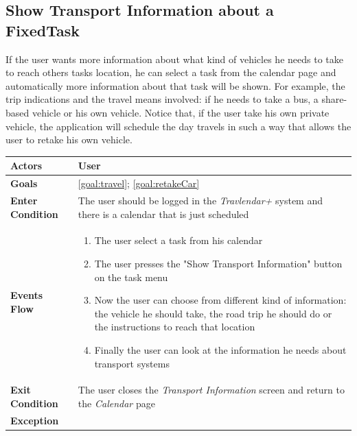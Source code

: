 \subsection{Show Transport Information about a FixedTask}

If the user wants more information about what kind of vehicles he needs to take to reach others tasks location, he can select a task from the calendar page and automatically more information about that task will be shown. For example, the trip indications and the travel means involved: if he needs to take a bus, a share-based vehicle or his own vehicle. Notice that, if the user take his own private vehicle, the application will schedule the day travels in such a way that allows the user to retake his own vehicle. 

\begin{table}[H]
	\centering
    
    \begin{tabular}{|p{3.5cm}|p{10.3cm}|}
    
    \hline
    \textbf{\large{Actors}}  			& \tabitem User\\
    
    \hline
    \textbf{\large{Goals}} 				& \ref{goal:travel}; \ref{goal:retakeCar}\\
    
    \hline
    \textbf{\large{Enter Condition}}	& The user should be logged in the                                                                    \emph{Travlendar+} system and there is a calendar that is                                         just scheduled\\
    
    \hline
    \textbf{\large{Events Flow}}		& \begin{enumerate}[leftmargin=0.5cm]
                                          	\item The user select a task from his calendar
                                          	\item The user presses the "Show Transport Information" button on the task menu
                                          	\item Now the user can choose from different kind of information: the vehicle he should take, the road trip he should do or the instructions to reach that location
                                          	\item Finally the user can look at the information he needs about transport systems
                                          \end{enumerate}
    										\\
    \hline
    \textbf{\large{Exit Condition}} 	& The user closes the \emph{Transport Information} screen and return to the \emph{Calendar} page\\
    
    \hline
    \textbf{\large{Exception}} 			& \\
    
    \hline
    
    
    \end{tabular}
	
\end{table}

